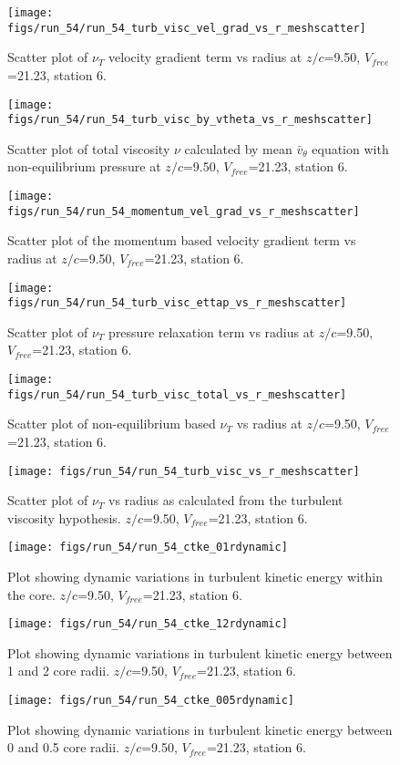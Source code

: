 \begin{figure}[H]
\centering
\texttt{[image: figs/run\_54/run\_54\_turb\_visc\_vel\_grad\_vs\_r\_meshscatter]}
\caption{Scatter plot of $\nu_T$ velocity gradient term vs radius at $z/c$=9.50, $V_{free}$=21.23, station 6.}
\end{figure}


\begin{figure}[H]
\centering
\texttt{[image: figs/run\_54/run\_54\_turb\_visc\_by\_vtheta\_vs\_r\_meshscatter]}
\caption{Scatter plot of total viscosity $\nu$ calculated by mean $\bar{v}_{\theta}$ equation with non-equilibrium pressure at $z/c$=9.50, $V_{free}$=21.23, station 6.}
\end{figure}


\begin{figure}[H]
\centering
\texttt{[image: figs/run\_54/run\_54\_momentum\_vel\_grad\_vs\_r\_meshscatter]}
\caption{Scatter plot of the momentum based velocity gradient term vs radius at $z/c$=9.50, $V_{free}$=21.23, station 6.}
\end{figure}


\begin{figure}[H]
\centering
\texttt{[image: figs/run\_54/run\_54\_turb\_visc\_ettap\_vs\_r\_meshscatter]}
\caption{Scatter plot of $\nu_T$ pressure relaxation term vs radius at $z/c$=9.50, $V_{free}$=21.23, station 6.}
\end{figure}


\begin{figure}[H]
\centering
\texttt{[image: figs/run\_54/run\_54\_turb\_visc\_total\_vs\_r\_meshscatter]}
\caption{Scatter plot of non-equilibrium based $\nu_T$ vs radius at $z/c$=9.50, $V_{free}$=21.23, station 6.}
\end{figure}


\begin{figure}[H]
\centering
\texttt{[image: figs/run\_54/run\_54\_turb\_visc\_vs\_r\_meshscatter]}
\caption{Scatter plot of $\nu_T$ vs radius as calculated from the turbulent viscosity hypothesis. $z/c$=9.50, $V_{free}$=21.23, station 6.}
\end{figure}


\begin{figure}[H]
\centering
\texttt{[image: figs/run\_54/run\_54\_ctke\_01rdynamic]}
\caption{Plot showing dynamic variations in turbulent kinetic energy within the core. $z/c$=9.50, $V_{free}$=21.23, station 6.}
\end{figure}


\begin{figure}[H]
\centering
\texttt{[image: figs/run\_54/run\_54\_ctke\_12rdynamic]}
\caption{Plot showing dynamic variations in turbulent kinetic energy between 1 and 2 core radii. $z/c$=9.50, $V_{free}$=21.23, station 6.}
\end{figure}


\begin{figure}[H]
\centering
\texttt{[image: figs/run\_54/run\_54\_ctke\_005rdynamic]}
\caption{Plot showing dynamic variations in turbulent kinetic energy between 0 and 0.5 core radii. $z/c$=9.50, $V_{free}$=21.23, station 6.}
\end{figure}


